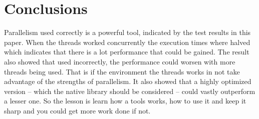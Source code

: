 \documentclass{article}
\begin{document}
\section{Conclusions}\label{conclusions}

Parallelism used correctly is a powerful tool, indicated by the test results in this paper. When the threads worked concurrently the execution times where halved which indicates that there is a lot performance that could be gained. The result also showed that used incorrectly, the performance could worsen with more threads being used. That is if the environment the threads works in not take advantage of the strengths of parallelism.  It also showed that a highly optimized version – which the native library should be considered – could vastly outperform a lesser one. So the lesson is learn how a tools works, how to use it and keep it sharp and you could get more work done if not.
\end{document}
